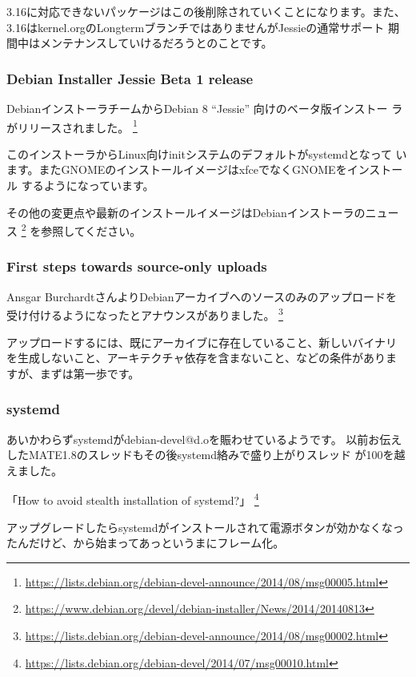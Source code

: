 \documentclass[mingoth,a4paper]{jsarticle}
\begin{document}
3.16に対応できないパッケージはこの後削除されていくことになります。また、
3.16はkernel.orgのLongtermブランチではありませんがJessieの通常サポート
期間中はメンテナンスしていけるだろうとのことです。


\subsubsection{Debian Installer Jessie Beta 1 release}

DebianインストーラチームからDebian 8 ``Jessie'' 向けのベータ版インストー
ラがリリースされました。
\footnote{\url{https://lists.debian.org/debian-devel-announce/2014/08/msg00005.html}}

このインストーラからLinux向けinitシステムのデフォルトがsystemdとなって
います。またGNOMEのインストールイメージはxfceでなくGNOMEをインストール
するようになっています。

その他の変更点や最新のインストールイメージはDebianインストーラのニュー
ス
\footnote{\url{https://www.debian.org/devel/debian-installer/News/2014/20140813}}
を参照してください。


\subsubsection{First steps towards source-only uploads}

Ansgar BurchardtさんよりDebianアーカイブへのソースのみのアップロードを
受け付けるようになったとアナウンスがありました。
\footnote{\url{https://lists.debian.org/debian-devel-announce/2014/08/msg00002.html}}

アップロードするには、既にアーカイブに存在していること、新しいバイナリ
を生成しないこと、アーキテクチャ依存を含まないこと、などの条件がありま
すが、まずは第一歩です。

\subsubsection{systemd}

あいかわらずsystemdがdebian-devel@d.oを賑わせているようです。
以前お伝えしたMATE1.8のスレッドもその後systemd絡みで盛り上がりスレッド
が100を越えました。

「How to avoid stealth installation of systemd?」
\footnote{\url{https://lists.debian.org/debian-devel/2014/07/msg00010.html}}

アップグレードしたらsystemdがインストールされて電源ボタンが効かなくなっ
たんだけど、から始まってあっというまにフレーム化。
\end{document}
